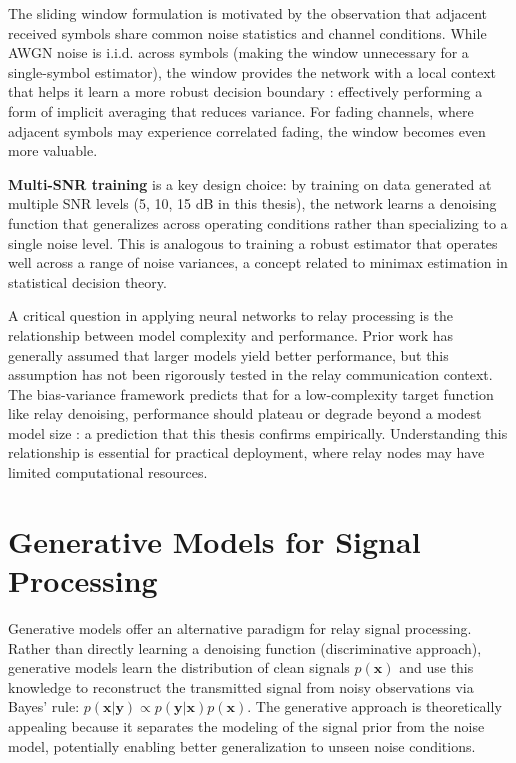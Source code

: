 The sliding window formulation is motivated by the observation that adjacent received symbols share common noise statistics and channel conditions. While AWGN noise is i.i.d. across symbols (making the window unnecessary for a single-symbol estimator), the window provides the network with a local context that helps it learn a more robust decision boundary : effectively performing a form of implicit averaging that reduces variance. For fading channels, where adjacent symbols may experience correlated fading, the window becomes even more valuable.

\textbf{Multi-SNR training} is a key design choice: by training on data generated at multiple SNR levels (5, 10, 15 dB in this thesis), the network learns a denoising function that generalizes across operating conditions rather than specializing to a single noise level. This is analogous to training a robust estimator that operates well across a range of noise variances, a concept related to minimax estimation in statistical decision theory.

A critical question in applying neural networks to relay processing is the relationship between model complexity and performance. Prior work has generally assumed that larger models yield better performance, but this assumption has not been rigorously tested in the relay communication context. The bias-variance framework predicts that for a low-complexity target function like relay denoising, performance should plateau or degrade beyond a modest model size : a prediction that this thesis confirms empirically. Understanding this relationship is essential for practical deployment, where relay nodes may have limited computational resources.

\section{Generative Models for Signal Processing}\label{sec:generative-models-for-signal-processing}

Generative models offer an alternative paradigm for relay signal processing. Rather than directly learning a denoising function (discriminative approach), generative models learn the distribution of clean signals \(p(\mathbf{x})\) and use this knowledge to reconstruct the transmitted signal from noisy observations via Bayes' rule: \(p(\mathbf{x} | \mathbf{y}) \propto p(\mathbf{y} | \mathbf{x}) p(\mathbf{x})\). The generative approach is theoretically appealing because it separates the modeling of the signal prior from the noise model, potentially enabling better generalization to unseen noise conditions.

